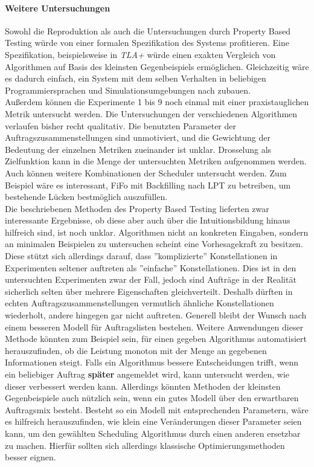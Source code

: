\paragraph{Weitere Untersuchungen}
Sowohl die Reproduktion als auch die Untersuchungen durch Property Based Testing würde von einer formalen Spezifikation des Systems profitieren. Eine Spezifikation, beispielsweise in \emph{TLA+} würde einen exakten Vergleich von Algorithmen auf Basis des kleinsten Gegenbeispiels ermöglichen. Gleichzeitig wäre es dadurch einfach, ein System mit dem selben Verhalten in beliebigen Programmiersprachen und Simulationsumgebungen nach zubauen.\\
Außerdem können die Experimente 1 bis 9 noch einmal mit einer praxistauglichen Metrik untersucht werden. Die Untersuchungen der verschiedenen Algorithmen verlaufen bisher recht qualitativ. Die benutzten Parameter der Auftragszusammenstellungen sind unmotiviert, und die Gewichtung der Bedeutung der einzelnen Metriken zueinander ist unklar. Drosselung als Zielfunktion kann in die Menge der untersuchten Metriken aufgenommen werden.\\
Auch können weitere Kombinationen der Scheduler untersucht werden. Zum Beispiel wäre es interessant, FiFo mit Backfilling nach LPT zu betreiben, um bestehende Lücken bestmöglich auszufüllen.\\
Die beschriebenen Methoden des Property Based Testing lieferten zwar interessante Ergebnisse, ob diese aber auch über die Intuitionsbildung hinaus hilfreich sind, ist noch unklar. Algorithmen nicht an konkreten Eingaben, sondern an minimalen Beispielen zu untersuchen scheint eine Vorhesagekraft zu besitzen. Diese stützt sich allerdings darauf, dass ''komplizierte'' Konstellationen in Experimenten seltener auftreten als ''einfache'' Konstellationen. Dies ist in den untersuchten Experimenten zwar der Fall, jedoch sind Aufträge in der Realität sicherlich selten über mehrere Eigenschaften gleichverteilt. Deshalb dürften in echten Auftragszusammenstellungen vermutlich ähnliche Konstellationen wiederholt, andere hingegen gar nicht auftreten. Generell bleibt der Wunsch nach einem besseren Modell für Auftragslisten bestehen. Weitere Anwendungen dieser Methode könnten zum Beispiel sein, für einen gegeben Algorithmus automatisiert herauszufinden, ob die Leistung monoton mit der Menge an gegebenen Informationen steigt. Falls ein Algorithmus bessere Entscheidungen trifft, wenn ein beliebiger Auftrag \textbf{später} angemeldet wird, kann untersucht werden, wie dieser verbessert werden kann. Allerdings könnten  Methoden der kleinsten Gegenbeispiele auch nützlich sein, wenn ein gutes Modell über den erwartbaren Auftragsmix besteht. Besteht so ein Modell mit entsprechenden Parametern, wäre es hilfreich herauszufinden, wie klein eine Veränderungen dieser Parameter seien kann, um den gewählten Scheduling Algorithmus durch einen anderen ersetzbar zu machen. Hierfür sollten sich allerdings klassische Optimierungsmethoden besser eignen. 